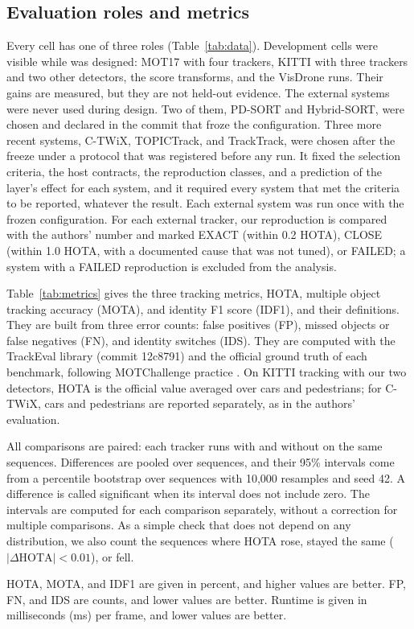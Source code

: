 \subsection{Evaluation roles and metrics}\label{sec:roles}
Every cell has one of three roles (Table~\ref{tab:data}). Development cells
were visible while \scl{} was designed: MOT17 with four trackers, KITTI with
three trackers and two other detectors, the score transforms, and the VisDrone
runs. Their gains are measured, but they are not held-out evidence. The
external systems were never used during design. Two of them, PD-SORT and
Hybrid-SORT, were chosen and declared in the commit that froze the
configuration. Three more recent systems, C-TWiX, TOPICTrack, and TrackTrack,
were chosen after the freeze under a protocol that was registered before any
run. It fixed the selection criteria, the host contracts, the reproduction
classes, and a prediction of the layer's effect for each system, and it
required every system that met the criteria to be reported, whatever the
result. Each external system was run once with the frozen configuration. For
each external tracker, our reproduction is compared with the authors' number
and marked EXACT (within 0.2 HOTA), CLOSE (within 1.0 HOTA, with a documented
cause that was not tuned), or FAILED; a system with a FAILED reproduction is
excluded from the analysis.

\label{sec:metrics}Table~\ref{tab:metrics} gives the three tracking metrics,
HOTA, multiple object tracking accuracy (MOTA), and identity F1 score (IDF1),
and their definitions. They are built from three error counts: false
positives (FP), missed objects or false negatives (FN), and identity switches
(IDS). They are computed with the TrackEval library (commit
12c8791) and the official ground truth of each benchmark, following
MOTChallenge practice \cite{dendorfer2021motchallenge}. On KITTI tracking
with our two detectors, HOTA is the official value averaged over cars and
pedestrians; for C-TWiX, cars and pedestrians are reported separately, as in
the authors' evaluation.



All comparisons are paired: each tracker runs with and without \scl{} on
the same sequences. Differences are pooled over sequences, and their 95\%
intervals come from a percentile bootstrap over sequences
\cite{efron1993bootstrap} with 10,000 resamples and seed 42. A difference is
called significant when its interval does not include zero. The intervals
are computed for each comparison separately, without a correction for
multiple comparisons. As a simple
check that does not depend on any distribution, we also count the sequences
where HOTA rose, stayed the same ($|\Delta\mathrm{HOTA}|<0.01$), or fell.

HOTA, MOTA, and IDF1 are given in percent, and higher values are better. FP,
FN, and IDS are counts, and lower values are better. Runtime is given in
milliseconds (ms) per frame, and lower values are better.
